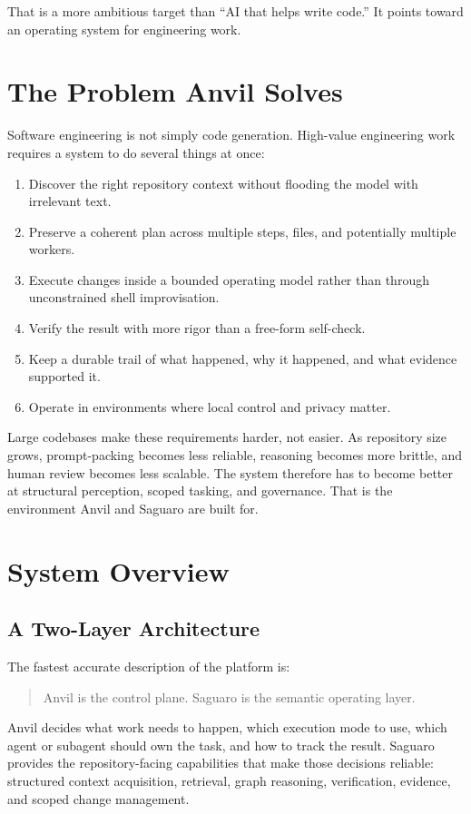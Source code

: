 \documentclass[11pt,a4paper]{article}
\begin{document}
That is a more ambitious target than ``AI that helps write code.'' It points toward an operating system for engineering work.

\section{The Problem Anvil Solves}
Software engineering is not simply code generation. High-value engineering work requires a system to do several things at once:
\begin{enumerate}
    \item Discover the right repository context without flooding the model with irrelevant text.
    \item Preserve a coherent plan across multiple steps, files, and potentially multiple workers.
    \item Execute changes inside a bounded operating model rather than through unconstrained shell improvisation.
    \item Verify the result with more rigor than a free-form self-check.
    \item Keep a durable trail of what happened, why it happened, and what evidence supported it.
    \item Operate in environments where local control and privacy matter.
\end{enumerate}

Large codebases make these requirements harder, not easier. As repository size grows, prompt-packing becomes less reliable, reasoning becomes more brittle, and human review becomes less scalable. The system therefore has to become better at structural perception, scoped tasking, and governance. That is the environment Anvil and Saguaro are built for.

\section{System Overview}
\subsection{A Two-Layer Architecture}
The fastest accurate description of the platform is:
\begin{quote}
Anvil is the control plane. Saguaro is the semantic operating layer.
\end{quote}

Anvil decides what work needs to happen, which execution mode to use, which agent or subagent should own the task, and how to track the result. Saguaro provides the repository-facing capabilities that make those decisions reliable: structured context acquisition, retrieval, graph reasoning, verification, evidence, and scoped change management.
\end{document}
